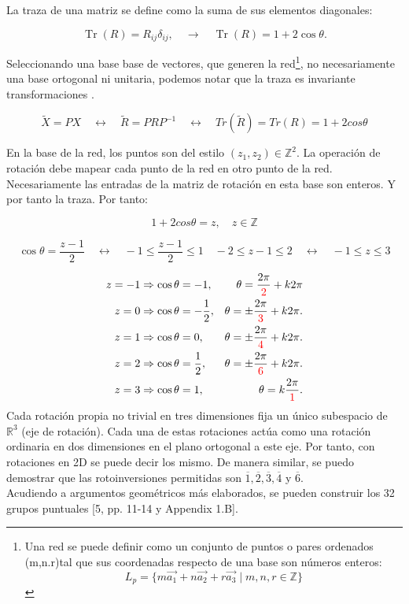 \documentclass{report}
\begin{document}
La traza de una matriz se define como la suma de sus elementos diagonales:

\[
\operatorname{Tr}(R) = R_{ij}\delta_{ij},\quad  \longrightarrow \quad
\operatorname{Tr}(R) = 1 + 2\cos\theta.
\]


Seleccionando una base base de vectores, que generen la red\footnote{Una red se puede definir como un conjunto de puntos o pares ordenados (m,n.r)tal que sus coordenadas respecto de una base son  números enteros:
\[L_p  = \{ m\vec{a_1} + n\vec{a_2} + r\vec{a_3} \mid m, n, r \in \mathbb{Z} \}\]
}, no necesariamente una base ortogonal ni unitaria, podemos notar que la traza es invariante transformaciones . 

\[\tilde{X}=PX \quad \leftrightarrow \quad \tilde{R}=PRP^{-1} \quad \leftrightarrow \quad Tr(\tilde{R})=Tr(R)=1+2cos\theta\]

En la base de la red, los puntos son del estilo $(z_1,z_2)\in \mathbb{Z}^2$. La operación de rotación debe mapear cada punto de la red en otro punto de la red. Necesariamente las entradas de la matriz de rotación en esta base son enteros. Y por tanto la traza. Por tanto:


\[1+2cos\theta =z, \quad z\in \mathbb{Z}\]

\[
\cos\theta = \frac{z - 1}{2}
\quad \leftrightarrow \quad
-1 \leq \frac{z - 1}{2} \leq 1
\quad 
-2 \leq z - 1 \leq 2 \quad \leftrightarrow \quad -1 \leq z \leq 3
\]

\vspace{.2cm}

\[
\begin{aligned}
z = -1 &\Rightarrow \cos\theta = -1, &\theta = \frac{2\pi}{\textcolor{red}{2}} + k 2\pi \\
z = 0 &\Rightarrow \cos\theta = -\frac{1}{2}, &\theta = \pm \frac{2\pi}{\textcolor{red}{3}} + k 2\pi. \\
z = 1 &\Rightarrow \cos\theta = 0, &\theta = \pm \frac{2\pi}{\textcolor{red}{4}} + k 2\pi. \\
z = 2 &\Rightarrow \cos\theta = \frac{1}{2}, &\theta = \pm \frac{2\pi}{\textcolor{red}{6}} + k 2\pi. \\
z = 3 &\Rightarrow \cos\theta = 1, &\theta = k \frac{2\pi}{\textcolor{red}{1}}.
\end{aligned}
\]
Cada rotación propia no trivial en tres dimensiones fija un único subespacio de 
$\mathbb{R}^{3}$ (eje de rotación). 
Cada una de estas rotaciones actúa como una rotación ordinaria en dos dimensiones en el plano ortogonal a este eje. Por tanto, con   rotaciones  en 2D se puede decir los mismo. De manera similar, se puedo demostrar que las rotoinversiones permitidas son $\overline{1},\overline{2},\overline{3},\overline{4}$ y $\overline{6}$.\\
\vspace{.2cm}
Acudiendo a argumentos geométricos más elaborados, se pueden construir los 32 grupos puntuales [5, pp. 11-14 y Appendix 1.B].\\
\vspace{.2cm}
\end{document}
